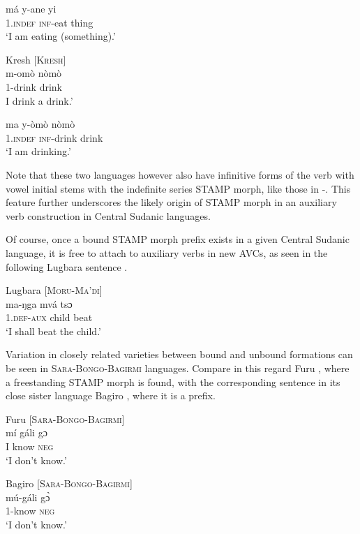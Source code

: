 \documentclass[output=paper]{langsci/langscibook}
\begin{document}
\ex \label{ex:anderson:55b}
\gll má    y-ane    yi\\
 1.\textsc{indef}  \textsc{inf}-eat    thing\\
\glt `I am eating (something).'
\z
\z

\ea\label{ex:anderson:56}
Kresh \citep[75]{TuckerBryan1966}     [\textsc{Kresh}]\\
\ea\label{ex:anderson:56a}
\gll m-omò    nòmò\\
  1-drink   drink    \\
\glt I drink a drink.'     


\ex \label{ex:anderson:56b}
\gll ma     y-òmò    nòmò\\
  \textsc{1.indef}  \textsc{inf}-drink   drink\\
\glt `I am drinking.'
\z
\z

Note that these two languages however also have infinitive forms of the verb with vowel initial stems with the indefinite series STAMP morph, like those in -. This feature further underscores the likely origin of STAMP morph in an auxiliary verb construction in Central Sudanic languages.

Of course, once a bound STAMP morph prefix exists in a given Central Sudanic language, it is free to attach to auxiliary verbs in new AVCs, as seen in the following Lugbara sentence .

\ea\label{ex:anderson:57}
Lugbara \citep[46, 47]{TuckerBryan1966}      \textsc{[Moru-Ma'di]}\\
\gll ma-ŋga  mvá  tsɔ\\
\textsc{1.def-aux}  child  beat\\
\glt `I shall beat the child.'    
\z

Variation in closely related varieties between bound and unbound formations can be seen in \textsc{Sara-Bongo-Bagirmi} languages. Compare in this regard Furu , where a freestanding STAMP morph is found, with the corresponding sentence in its close sister language Bagiro , where it is a prefix.

\ea\label{ex:anderson:58}
Furu \citep[91]{Boyeldieu1990}           [\textsc{Sara-Bongo-Bagirmi}]\\
\gll mí  gáli  gɔ          \\
I   know  \textsc{neg}      \\
\glt `I don't know.'
\z

\ea\label{ex:anderson:59}
Bagiro  \citep[91]{Boyeldieu1990}           [\textsc{Sara-Bongo-Bagirmi}]\\
\gll mú-gá{\downstep}li  g\`{ɔ}\\
1-know  \textsc{neg}\\
\glt `I don't know.'  
\z
\end{document}
